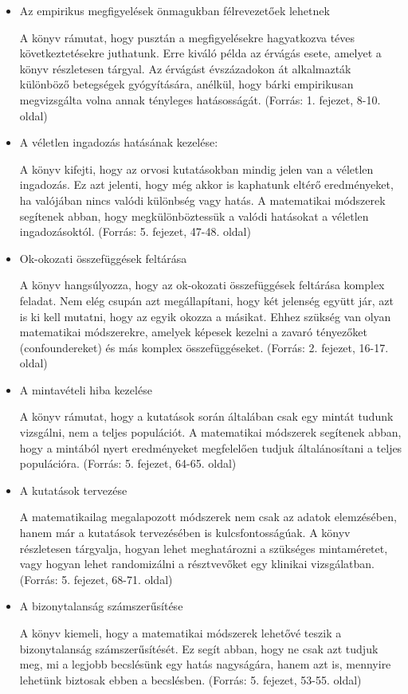 \documentclass[a4paper,12pt]{article}
\begin{document}
    \begin{itemize}

        \item Az empirikus megfigyelések önmagukban félrevezetőek lehetnek

        A könyv rámutat, hogy pusztán a megfigyelésekre hagyatkozva téves következtetésekre juthatunk. Erre kiváló példa az érvágás esete, amelyet a könyv részletesen tárgyal. Az érvágást évszázadokon át alkalmazták különböző betegségek gyógyítására, anélkül, hogy bárki empirikusan megvizsgálta volna annak tényleges hatásosságát. (Forrás: 1. fejezet, 8-10. oldal)

        \item A véletlen ingadozás hatásának kezelése:

        A könyv kifejti, hogy az orvosi kutatásokban mindig jelen van a véletlen ingadozás. Ez azt jelenti, hogy még akkor is kaphatunk eltérő eredményeket, ha valójában nincs valódi különbség vagy hatás. A matematikai módszerek segítenek abban, hogy megkülönböztessük a valódi hatásokat a véletlen ingadozásoktól. (Forrás: 5. fejezet, 47-48. oldal)

        \item Ok-okozati összefüggések feltárása

        A könyv hangsúlyozza, hogy az ok-okozati összefüggések feltárása komplex feladat. Nem elég csupán azt megállapítani, hogy két jelenség együtt jár, azt is ki kell mutatni, hogy az egyik okozza a másikat. Ehhez szükség van olyan matematikai módszerekre, amelyek képesek kezelni a zavaró tényezőket (confoundereket) és más komplex összefüggéseket. (Forrás: 2. fejezet, 16-17. oldal)

        \item A mintavételi hiba kezelése

        A könyv rámutat, hogy a kutatások során általában csak egy mintát tudunk vizsgálni, nem a teljes populációt. A matematikai módszerek segítenek abban, hogy a mintából nyert eredményeket megfelelően tudjuk általánosítani a teljes populációra. (Forrás: 5. fejezet, 64-65. oldal)

        \item A kutatások tervezése

        A matematikailag megalapozott módszerek nem csak az adatok elemzésében, hanem már a kutatások tervezésében is kulcsfontosságúak. A könyv részletesen tárgyalja, hogyan lehet meghatározni a szükséges mintaméretet, vagy hogyan lehet randomizálni a résztvevőket egy klinikai vizsgálatban. (Forrás: 5. fejezet, 68-71. oldal)

        \item A bizonytalanság számszerűsítése

        A könyv kiemeli, hogy a matematikai módszerek lehetővé teszik a bizonytalanság számszerűsítését. Ez segít abban, hogy ne csak azt tudjuk meg, mi a legjobb becslésünk egy hatás nagyságára, hanem azt is, mennyire lehetünk biztosak ebben a becslésben. (Forrás: 5. fejezet, 53-55. oldal)

    \end{itemize}
\end{document}
